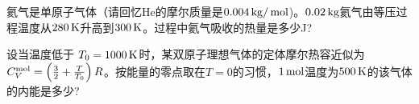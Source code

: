 \documentclass[CJK]{beamer}
\begin{document}
\begin{frame}
  \bchL
  氦气是单原子气体（请回忆He的摩尔质量是$0.004\,\mathrm{kg}/\,\mathrm{mol}$)。$0.02\,\mathrm{kg}$氦气由等压过程温度从$280\,\mathrm{K}$升高到$300\,\mathrm{K}$。过程中氦气吸收的热量是多少J?
  \echL
\end{frame}


\begin{frame}
  \bchL
设当温度低于 $T_0 = 1000\,\mathrm{K}$时，某双原子理想气体的定体摩尔热容近似为$C_V^{\rm mol} = \left(\frac{3}{2} + \frac{T}{T_0}\right)R$。按能量的零点取在$T=0$的习惯，$1\,\mathrm{mol}$温度为$500\,\mathrm{K}$的该气体的内能是多少?
  \echL
\end{frame}
\end{document}
